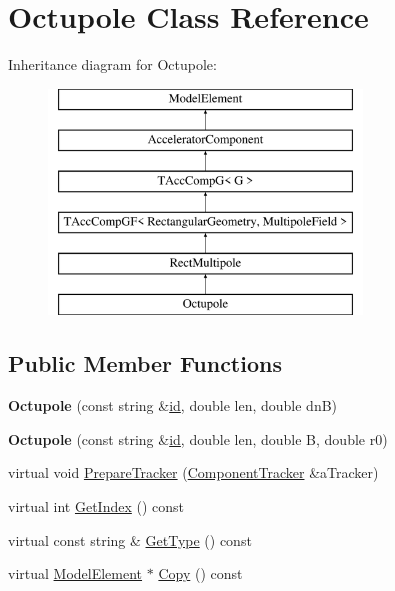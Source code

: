 \hypertarget{classOctupole}{}\section{Octupole Class Reference}
\label{classOctupole}
Inheritance diagram for Octupole\+:\begin{figure}[H]
\begin{center}
\leavevmode
\includegraphics[height=6.000000cm]{classOctupole}
\end{center}
\end{figure}
\subsection*{Public Member Functions}
\begin{DoxyCompactItemize}
\item 
\mbox{\label{classOctupole_a2e0f44eefe831616d0150a1733fba2de}} 
{\bfseries Octupole} (const string \&\hyperlink{classModelElement_aada171ead2085c75b592cf07d91bc5c2}{id}, double len, double dnB)
\item 
\mbox{\label{classOctupole_aac08ddbc1b2aca06d6918063f297c183}} 
{\bfseries Octupole} (const string \&\hyperlink{classModelElement_aada171ead2085c75b592cf07d91bc5c2}{id}, double len, double B, double r0)
\item 
virtual void \hyperlink{classOctupole_a646ac61a3ef6a66e987df0364d8bb465}{Prepare\+Tracker} (\hyperlink{classComponentTracker}{Component\+Tracker} \&a\+Tracker)
\item 
virtual int \hyperlink{classOctupole_acf28f59d4bb7f7ad6729e23902915d2b}{Get\+Index} () const
\item 
virtual const string \& \hyperlink{classOctupole_a6fc17a6bae176112451bb7aa8d31438c}{Get\+Type} () const
\item 
virtual \hyperlink{classModelElement}{Model\+Element} $\ast$ \hyperlink{classOctupole_a41df65c2095e03ee2347a7b3b986baa1}{Copy} () const
\end{DoxyCompactItemize}
